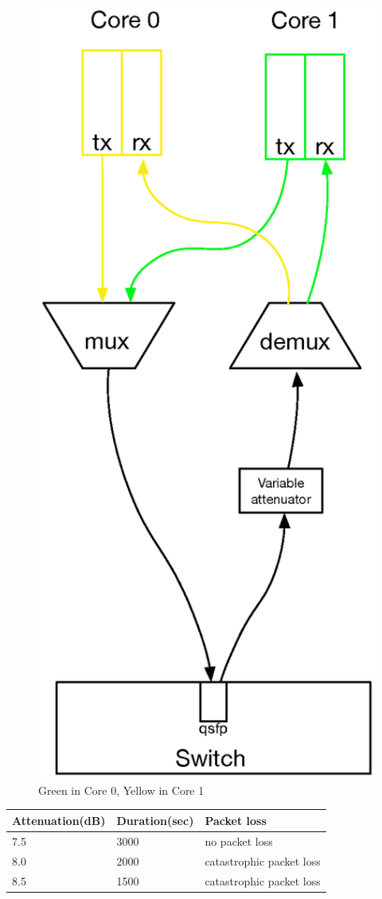\documentclass{article}
\begin{document}
{\begin{figure}[h!]
\begin{minipage}{.5\textwidth}
		\includegraphics[width = .6\linewidth]{yellowgreencore1varrxcom.eps}
		\caption{Green in Core 0, Yellow in Core 1}
		\label{fig:greencore1}
	\end{minipage}
\end{figure}
\begin{table}[ht]
\begin{minipage}{.5\textwidth}
\begin{center}
\begin{tabular}{|p{2.5cm}|p{2.5cm}|p{2.5cm}|}
	\hline
	 Attenuation(dB) & Duration(sec) & Packet loss \\ \hline
	 7.5  & 3000 &  no packet loss \\ \hline
	 8.0  &  2000 & catastrophic packet loss \\ \hline
	 8.5  & 1500 & catastrophic packet loss \\ \hline
\end{tabular}
\end{center}

\end{minipage}
\end{table}}
\end{document}
